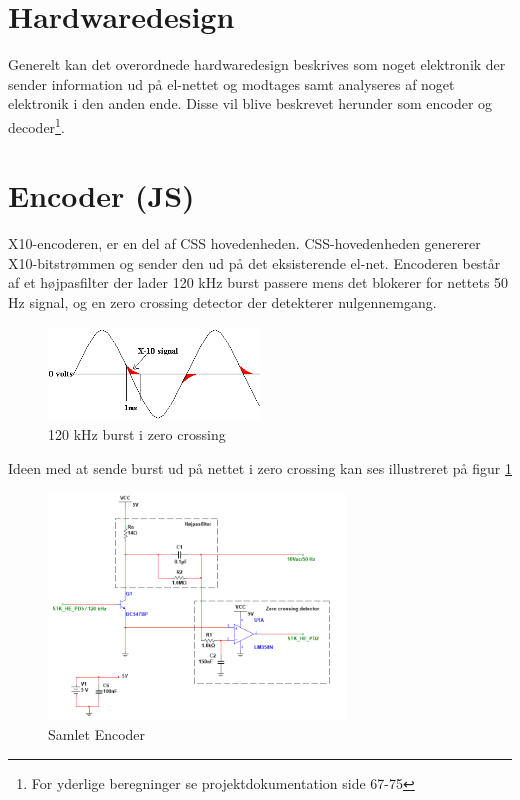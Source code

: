 \section{Hardwaredesign}

Generelt kan det overordnede hardwaredesign beskrives som noget elektronik der sender information ud på el-nettet og modtages samt analyseres af noget elektronik i den anden ende. Disse vil blive beskrevet herunder som encoder og decoder\footnote{For yderlige beregninger se projektdokumentation side 67-75}.  


\section{Encoder (JS)}
X10-encoderen, er en del af CSS hovedenheden. CSS-hovedenheden genererer X10-bitstrømmen og sender den ud på det eksisterende el-net. Encoderen består af et højpasfilter der lader 120 kHz burst passere mens det blokerer for nettets 50 Hz signal, og en zero crossing detector der detekterer nulgennemgang.

\begin{figure}[htbp]
	\centering
	\includegraphics[width=0.50\textwidth]{billeder/HWdesign/X10_BURST}
	\caption{120 kHz burst i zero crossing}
	\label{fig:X10_BURST}
\end{figure}

Ideen med at sende burst ud på nettet i zero crossing kan ses illustreret på figur \ref{fig:X10_BURST}

\begin{figure}[htbp]
	\centering
	\includegraphics[width=0.70\textwidth]{billeder/HWdesign/Encoder}
	\caption{Samlet Encoder}
	\label{fig:Encoder}
\end{figure}
\newpage

